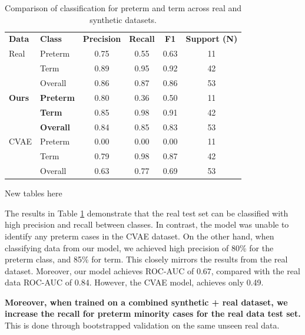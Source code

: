 \documentclass[sigconf, review]{acmart}
\begin{document}
\begin{table}[t]
\caption{Comparison of classification for preterm and term across real and synthetic datasets.}
\label{tab:classif}
\centering
\begin{tabular}{llcccc}
    \toprule
\textbf{Data}      & \textbf{Class}   & \textbf{Precision} & \textbf{Recall} & \textbf{F1}   & \textbf{Support (N)} \\
Real      & Preterm & 0.75      & 0.55   & 0.63 & 11     \\
          & Term    & 0.89      & 0.95   & 0.92 & 42     \\
          & Overall & 0.86      & 0.87   & 0.86 & 53     \\
\midrule
\textbf{Ours} & \textbf{Preterm} & 0.80      & 0.36   & 0.50 & 11     \\
          & \textbf{Term}    & 0.85      & 0.98   & 0.91 & 42     \\
          & \textbf{Overall} & 0.84      & 0.85   & 0.83 & 53     \\
\midrule
CVAE      & Preterm & 0.00      & 0.00   & 0.00 & 11     \\
          & Term    & 0.79      & 0.98   & 0.87 & 42     \\
          & Overall & 0.63      & 0.77   & 0.69 & 53    
\bottomrule
\end{tabular}
\end{table}






New tables here

















The results in Table \ref{tab:classif} demonstrate that the real test set can be classified with high precision and recall between classes. In contrast, the model was unable to identify any preterm cases in the CVAE dataset. On the other hand, when classifying data from our model, we achieved high precision of 80\% for the preterm class, and 85\% for term. This closely mirrors the results from the real dataset. Moreover, our model achieves ROC-AUC of 0.67, compared with the real data ROC-AUC of 0.84. However, the CVAE model, achieves only 0.49. 


\textbf{Moreover, when trained on a combined synthetic + real dataset, we increase the recall for preterm minority cases for the real data test set. } This is done through bootstrapped validation on the same unseen real data. 
\end{document}
